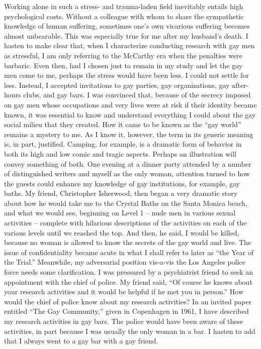 Working alone in such a stress- and trauma-laden field inevitably entails high psychological costs. Without a colleague with whom to share the sympathetic knowledge of human suffering, sometimes one's own vicarious suffering becomes almost unbearable. This was especially true for me after my husband's death. I hasten to make clear that, when I characterize conducting research with gay men as stressful, I am only referring to the McCarthy era when the penalties were barbaric.
Even then, had I chosen just to remain in my study and let the gay men come to me, perhaps the stress would have been less. I could not settle for less. Instead, I accepted invitations to gay parties, gay organizations, gay after-hours clubs, and gay bars. I was convinced that, because of the secrecy imposed on gay men whose occupations and very lives were at risk if their identity became known, it was essential to know and understand everything I could about the gay social milieu that they created.
How it came to be known as the ``gay world'' remains a mystery to me. As I know it, however, the term in its generic meaning is, in part, justified. Camping, for example, is a dramatic form of behavior in both its high and low comic and tragic aspects. Perhaps an illustration will convey something of both. One evening at a dinner party attended by a number of distinguished writers and myself as the only woman, attention turned to how the guests could enhance my knowledge of gay institutions, for example, gay baths. My friend, Christopher Isherwood, then began a very dramatic story about how he would take me to the Crystal Baths on the Santa Monica beach, and what we would see, beginning on Level 1 – nude men in various sexual activities – complete with hilarious descriptions of the activities on each of the various levels until we reached the top. And then, he said, I would be killed, because no woman is allowed to know the secrets of the gay world and live.
The issue of confidentiality became acute in what I shall refer to later as ``the Year of the Trial.'' Meanwhile, my adversarial position vis-a-vis the Los Angeles police force needs some clarification. I was pressured by a psychiatrist friend to seek an appointment with the chief of police. My friend said, ``Of course he knows about your research activities and it would be helpful if he met you in person.'' How would the chief of police know about my research activities? In an invited paper entitled ``The Gay Community,'' given in Copenhagen in 1961, I have described my research activities in gay bars. The police would have been aware of these activities, in part because I was usually the only woman in a bar. I hasten to add that I always went to a gay bar with a gay friend.
